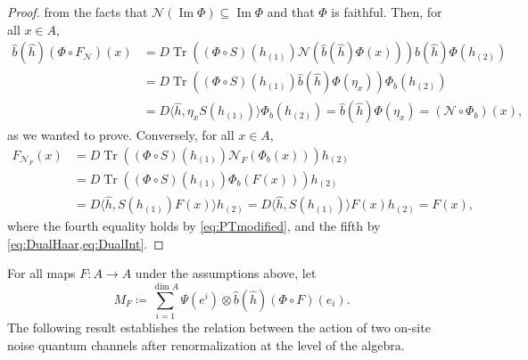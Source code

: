 \documentclass[a4paper,10pt]{amsart}
\newcommand{\Noisy}{\mathcal{N}}
\newcommand{\eval}[2]{\langle #1 , #2\rangle}
\theoremstyle{definition}
\begin{document}
\begin{proof}
   from the facts that $\Noisy(\operatorname{Im}\Phi)\subseteq \operatorname{Im}\Phi$ and that $\Phi$ is faithful.
    Then, for all $x\in A$,
	\begin{align}
		\hat{b}(\hat{h}) (\Phi\circ F_{\Noisy})(x)
        & =
        D
        \operatorname{Tr}(  (\Phi\circ S)(h_{(1)})
                            \Noisy(\hat{b}(\hat{h})\Phi(x))  )
            \hat{b}(\hat{h}) \Phi(h_{(2)})
		\\ &
        =
        D
        \operatorname{Tr}(  (\Phi\circ S)(h_{(1)})
                            \hat{b}(\hat{h}) \Phi(\eta_x)  )
            \Phi_b(h_{(2)})
        \\ &
        =
        D \eval{\hat{h}}{\eta_x S(h_{(1)})}  \Phi_b(h_{(2)})
        =
        \hat{b}(\hat{h})\Phi(\eta_x)
        =
        (\Noisy \circ \Phi_b)(x),
	\end{align}
	as we wanted to prove. Conversely, for all $x\in A$,
    \begin{align}
        F_{\Noisy_F}(x)
        &=
        D \operatorname{Tr}( (\Phi\circ S)(h_{(1)}) \Noisy_F(\Phi_b(x)) ) h_{(2)}
        \\ &=
        D \operatorname{Tr}( (\Phi\circ S)(h_{(1)}) \Phi_b(F(x)) ) h_{(2)}
        \\ &=
        D \eval{\hat{h}}{S(h_{(1)}) F(x)} h_{(2)}
        =
        D \eval{\hat{h}}{S(h_{(1)})} F(x) h_{(2)}
        =
        F(x),
    \end{align} 
    where the fourth equality holds by \cref{eq:PTmodified}, and the fifth by \cref{eq:DualHaar,eq:DualInt}.
\end{proof}

For all maps $F:A\to A$ under the assumptions above, let
\begin{equation}
M_F
	\coloneqq
    \sum_{i=1}^{\dim A}
        \Psi(e^i)
        \otimes
        \hat{b}(\hat{h})(\Phi\circ F)(e_i).
\end{equation}
The following result establishes the relation between the action of two on-site noise quantum channels after renormalization at the level of the algebra.
\end{document}
